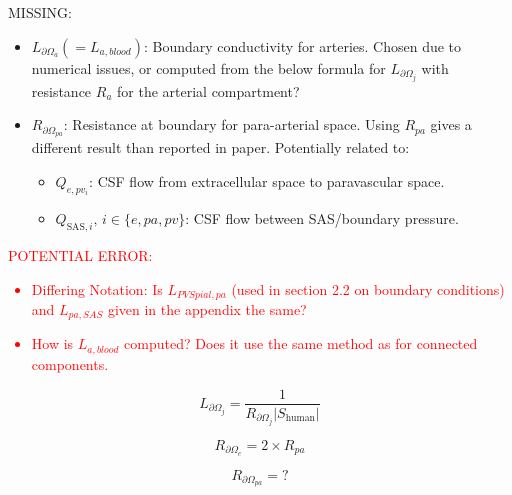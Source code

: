 \documentclass{article}
\theoremstyle{definition}
\theoremstyle{plain}
\theoremstyle{remark}
\newcommand{\MISSING}[1]{\textcolor{OliveGreen}{MISSING: #1}}
\newcommand{\ISSUE}[1]{\textcolor{red}{POTENTIAL ERROR: #1}}
\begin{document}
\MISSING{
    \begin{itemize}
        \item \( L_{\partial\Omega_a} (=L_{a, blood} )  \): Boundary conductivity for arteries. Chosen due to numerical issues, or computed from the below formula for \( L_{\partial\Omega_{j}} \) with resistance \( R_a \) for the arterial compartment?
        \item \( R_{\partial\Omega_{pa}} \): Resistance at boundary for para-arterial space. Using \( R_{pa} \) gives a different result than reported in paper. Potentially related to:
    \begin{itemize}
        \item $Q_{e, pv_i}$: CSF flow from extracellular space to paravascular space.
        \item $Q_{\text{SAS}, i}, \, i \in \{e, pa, pv\}$: CSF flow between SAS/boundary pressure.
    \end{itemize}
    \end{itemize}
}
\ISSUE{
\begin{itemize}
    \item Differing Notation: Is \( L_{PVSpial, pa} \) (used in section 2.2 on boundary conditions) and $L_{pa, SAS}$ given in the appendix the same?
    \item How is $L_{a, blood}$ computed? Does it use the same method as for connected components.
\end{itemize}
} 

\begin{equation}
    L_{\partial\Omega_j} = \frac{1}{R_{\partial\Omega_j} \lvert S_{\text{human}} \rvert}
\end{equation}

\begin{equation}
    R_{\partial\Omega_e} =  2 \times R_{pa}
\label{eq: surface resistance ecs} 
\end{equation}

\begin{equation}
  R_{\partial\Omega_{pa}} = ?
\end{equation}
\end{document}
